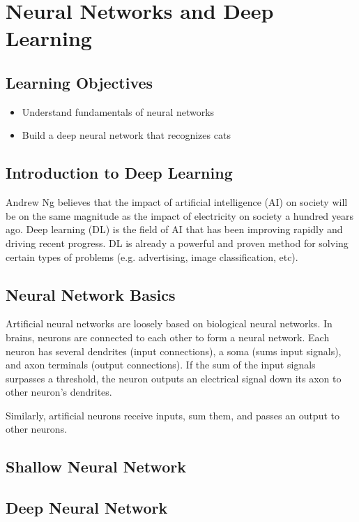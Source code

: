 \chapter{Neural Networks and Deep Learning}
\section*{Learning Objectives}
\begin{itemize}
  \item Understand fundamentals of neural networks
  \item Build a deep neural network that recognizes cats
\end{itemize}

\section{Introduction to Deep Learning}
Andrew Ng believes that the impact of artificial intelligence (AI) on society will be on the same magnitude as the impact of electricity on society a hundred years ago. Deep learning (DL) is the field of AI that has been improving rapidly and driving recent progress. DL is already a powerful and proven method for solving certain types of problems (e.g. advertising, image classification, etc). 


\section{Neural Network Basics}
Artificial neural networks are loosely based on biological neural networks. In brains, neurons are connected to each other to form a neural network. Each neuron has several dendrites (input connections), a soma (sums input signals), and axon terminals (output connections). If the sum of the input signals surpasses a threshold, the neuron outputs an electrical signal down its axon to other neuron's dendrites. 


Similarly, artificial neurons receive inputs, sum them, and passes an output to other neurons.  

\section{Shallow Neural Network}
\section{Deep Neural Network}
